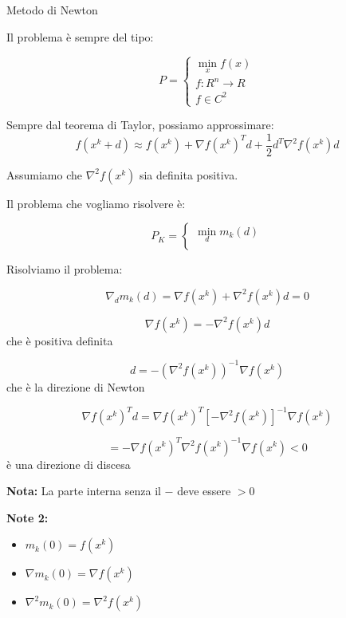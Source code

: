 \begin{definition}
    Metodo di Newton

    Il problema è sempre del tipo:

    $$
    P = \begin{cases}
        \min_{x} f(x) \\
        f: R^n \rightarrow R \\
        f \in C^2
    \end{cases}
    $$

    Sempre dal teorema di Taylor, possiamo approssimare:
    $$
    f(x^k + d) \approx f(x^k) + \nabla f(x^k)^T d + \frac{1}{2} d^T \nabla^2 f(x^k) d
    $$

    Assumiamo che $\nabla^2 f(x^k)$ sia definita positiva.

    Il problema che vogliamo risolvere è:

    $$
    P_K = \begin{cases}
        \min_{d} m_k(d)\\
    \end{cases}
    $$

    Risolviamo il problema:

    $$\nabla_d m_k(d) = \nabla f(x^k) + \nabla^2 f(x^k) d = 0$$
    
    $$\nabla f(x^k) = - \nabla^2 f(x^k) d$$ che è positiva definita 

    $$d = -(\nabla^2 f(x^k))^{-1} \nabla f(x^k)$$ che è la direzione di Newton

    $$\nabla f(x^k)^T d = \nabla f(x^k)^T [ -\nabla^2 f(x^k)]^{-1} \nabla f(x^k)$$

    $$=-\nabla f(x^k)^T  \nabla^2 f(x^k)^{-1} \nabla f(x^k) < 0$$ è una direzione di discesa

    \textbf{Nota:} La parte interna senza il $-$ deve essere $>0$

    \textbf{Note 2:}
    \begin{itemize}
        \item $m_k(0) = f(x^k)$
        \item $\nabla m_k(0) = \nabla f(x^k)$
        \item $\nabla^2 m_k(0) = \nabla^2 f(x^k)$
    \end{itemize}
\end{definition}


\newpage